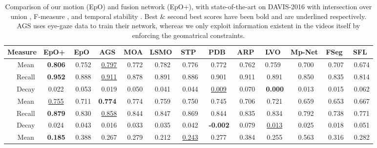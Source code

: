 \documentclass[10pt,twocolumn,letterpaper]{article}
\begin{document}
\setlength{\tabcolsep}{1.4pt}
\begin{table*}[!h]
\begin{center}
\centering
\begin{tabular}{cc|cc|cccccccccc}
\hline
\hline

\multicolumn{2}{c|}{Measure} & EpO+ & EpO & \small{AGS\cite{ags}} & \small{MOA\cite{MotAdapt}} & \small{LSMO\cite{lsmo}}  & \small{STP\cite{STP}} &  \small{PDB\cite{PDB}} & \small{ARP\cite{ARP}} & \small{LVO\cite{visMem}} & \small{Mp-Net\cite{MpNet}} & \small{FSeg\cite{fusionseg}} & \small{SFL\cite{SegFlow}}   \\  
\hline

&Mean  &\bf\ 0.806 & \ 0.752 & \ \underline{0.797} & \  0.772    & \  0.782     & \ 0.776 & \ 0.772 & \ 0.762 & 0.759 & \ 0.700 & \ 0.707 & \ 0.674  \\

 & Recall    & \bf \ 0.952 & \ 0.888 & \  \underline{0.911}  & \ 0.878     & \ 0.891 & \ 0.886 &  \ 0.901 &   \ 0.911 & \ 0.891 &   \ 0.850 &   \ 0.835 &  \ 0.814  \\

&Decay   &\ 0.022 & \ 0.053 & \ 0.019  & \ 0.050    & \ 0.041     & \ 0.044 & \ \underline{0.009} & \ 0.070 &\bf\ 0.000 &   \ 0.013 &   \ 0.015 & \ 0.062 \\
\hline
& Mean  & \  \underline{0.755} & \ 0.711 & \bf 0.774  & \ 0.774 & \ 0.759 & \ 0.750 &  \ 0.745 &   \ 0.706 & \ 0.721 &   \ 0.659 &   \ 0.653 &   \ 0.667 \\
 & Recall    &\bf\ 0.879 & \ 0.830 & \ \underline{0.858}  & \ 0.844    & \  0.847  & \ 0.869 & \ 0.844 &   \ 0.835 & \ 0.834 &   \ 0.792  &   \ 0.738 &   \ 0.771  \\
& Decay   & \ 0.024 & \ 0.043  & \ 0.016  & \ 0.033 & \     0.035    & \ 0.042 &\bf\ -0.002 &   \ 0.079 & \ \underline{0.013} &   \ 0.025 &   \ 0.018  &   \ 0.051 \\
\hline
 & Mean  &\bf\ 0.185 & \ 0.388 & \ 0.267  & \ 0.279     & \  0.212    & \ \underline{0.243} &  \ 0.277 &   \ 0.384 &   \ 0.255 &   \ 0.563 &   \ 0.316 &   \ 0.282  \\
\hline
\hline
\end{tabular}
\vspace{-0.3cm}
\caption{Comparison of our motion (EpO) and fusion network (EpO+), with state-of-the-art on DAVIS-2016 with intersection over union , F-measure , and temporal stability . Best \& second best scores have been bold and are underlined respectively. AGS uses eye-gaze data to train their network, whereas we only exploit information existent in the videos itself by enforcing the geomatrical constraints.\label{tab:comparisonTable2016}} 
\vspace{-0.3in}
\end{center}
\end{table*}
\end{document}
